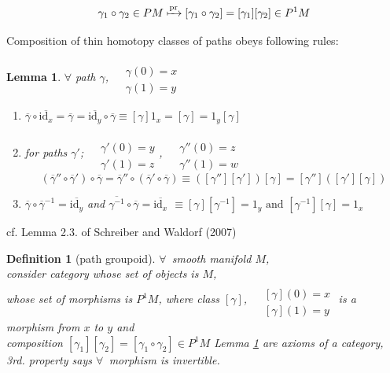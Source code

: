 \documentclass[10pt]{amsart}
\newtheorem{lemma}{Lemma}
\newtheorem{definition}{Definition}
\begin{document}
\begin{multicols*}{2}
\[
\gamma_1 \circ \gamma_2 \in PM \xmapsto{\text{pr}} [\gamma_1 \circ \gamma_2] = [\gamma_1][ \gamma_2] \in P^1M
\]

Composition of thin homotopy classes of paths obeys following rules:
\begin{lemma}\label{Eq:CompositionOfThinHomotopyClassesOfPaths}
$\forall$ path $\gamma$, $\begin{aligned} & \quad \\ 
& \gamma(0) = x \\
& \gamma(1) = y \end{aligned}$
\begin{enumerate}
	\item $\overline{\gamma} \circ \overline{\text{id}_x} = \overline{\gamma} = \overline{\text{id}_y} \circ \overline{\gamma} \equiv [\gamma]1_x = [\gamma] = 1_y [\gamma] $ 
	\item for paths $\gamma'$; $\begin{aligned} & \quad \\ 
		& \gamma'(0) = y \\
		& \gamma'(1) = z \end{aligned}$, \quad $\begin{aligned} & \quad \\ 
	& \gamma''(0) = z \\
& \gamma''(1) = w \end{aligned}$
\begin{equation}
(\overline{\gamma}'' \circ \overline{\gamma}') \circ \overline{\gamma} = \overline{\gamma}'' \circ (\overline{\gamma}' \circ \overline{\gamma}) \equiv ( [\gamma''][\gamma'])[\gamma] = [\gamma'']([\gamma'][\gamma])
\end{equation}
\item $\overline{\gamma} \circ \overline{\gamma}^{-1} = \overline{\text{id}_y}$ and $\overline{\gamma^{-1}} \circ \overline{\gamma} = \overline{\text{id}_x}$ $\equiv [\gamma] [\gamma^{-1}] = 1_y \text{ and } [\gamma^{-1}][\gamma] = 1_x$
\end{enumerate} 	
\end{lemma}
cf. Lemma 2.3. of Schreiber and Waldorf (2007)\cite{ScWa2007}  

\begin{definition}[path groupoid]
	$\forall \, $ smooth manifold $M$, \\
	consider category whose set of objects is $M$, \\
	whose set of morphisms is $P^1M$, where class $[\gamma]$, $\begin{aligned} & \qquad \\ 
	& [\gamma](0) = x \\
	& [\gamma](1) = y \end{aligned}$ is a morphism from $x$ to $y$ and \\
	composition $[\gamma_1 ][\gamma_2] = [\gamma_1 \circ \gamma_2] \in P^1M$  
	Lemma \ref{Eq:CompositionOfThinHomotopyClassesOfPaths} are axioms of a category, 3rd. property says $\forall \,$ morphism is invertible.  
	

\end{definition}
\end{multicols*}
\end{document}
